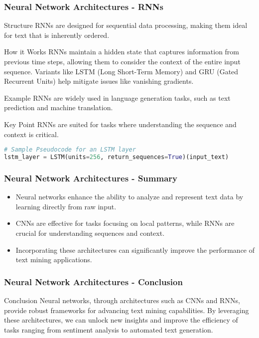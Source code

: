 \documentclass[aspectratio=169]{beamer}
\begin{document}
\begin{frame}[fragile]
    \frametitle{Neural Network Architectures - RNNs}
    \begin{block}{Structure}
        RNNs are designed for sequential data processing, making them ideal for text that is inherently ordered.
    \end{block}

    \begin{block}{How it Works}
        RNNs maintain a hidden state that captures information from previous time steps, allowing them to consider the context of the entire input sequence. Variants like LSTM (Long Short-Term Memory) and GRU (Gated Recurrent Units) help mitigate issues like vanishing gradients.
    \end{block}

    \begin{block}{Example}
        RNNs are widely used in language generation tasks, such as text prediction and machine translation.
    \end{block}

    \begin{block}{Key Point}
        RNNs are suited for tasks where understanding the sequence and context is critical.
    \end{block}

    \begin{lstlisting}[language=Python]
# Sample Pseudocode for an LSTM layer
lstm_layer = LSTM(units=256, return_sequences=True)(input_text)
    \end{lstlisting}
\end{frame}

\begin{frame}
    \frametitle{Neural Network Architectures - Summary}
    \begin{itemize}
        \item Neural networks enhance the ability to analyze and represent text data by learning directly from raw input.
        \item CNNs are effective for tasks focusing on local patterns, while RNNs are crucial for understanding sequences and context.
        \item Incorporating these architectures can significantly improve the performance of text mining applications.
    \end{itemize}
\end{frame}

\begin{frame}
    \frametitle{Neural Network Architectures - Conclusion}
    \begin{block}{Conclusion}
        Neural networks, through architectures such as CNNs and RNNs, provide robust frameworks for advancing text mining capabilities. By leveraging these architectures, we can unlock new insights and improve the efficiency of tasks ranging from sentiment analysis to automated text generation.
    \end{block}
\end{frame}
\end{document}
